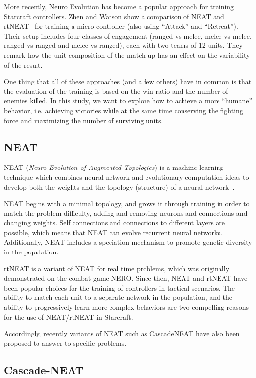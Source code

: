 More recently, Neuro Evolution has become a popular approach for
training Starcraft controllers. Zhen and Watson show a comparison of
NEAT and rtNEAT~\cite{ShWa13} for training a micro controller (also
using ``Attack'' and ``Retreat''). Their setup includes four classes
of engagement (ranged vs melee, melee vs melee, ranged vs ranged and
melee vs ranged), each with two teams of 12 units. They remark how the
unit composition of the match up has an effect on the variability of
the result.

One thing that all of these approaches (and a few others) have in
common is that the evaluation of the training is based on the win
ratio and the number of enemies killed. In this study, we want to
explore how to achieve a more ``humane'' behavior, i.e. achieving
victories while at the same time conserving the fighting force and
maximizing the number of surviving units.

\subsection{NEAT}\label{subsec:neat}

NEAT (\emph{Neuro Evolution of Augmented Topologies}) is a machine
learning technique which combines neural network and evolutionary
computation ideas to develop both the weights and the topology
(structure) of a neural network~\cite{StMi02}.

NEAT begins with a minimal topology, and grows it through training in
order to match the problem difficulty, adding and removing neurons and
connections and changing weights. Self connections and connections to
different layers are possible, which means that NEAT can evolve
recurrent neural networks. Additionally, NEAT includes a speciation
mechanism to promote genetic diversity in the population.

rtNEAT is a variant of NEAT for real time problems, which was
originally demonstrated on the combat game NERO. Since then, NEAT and
rtNEAT have been popular choices for the training of controllers in
tactical scenarios. The ability to match each unit to a separate
network in the population, and the ability to progressively learn more
complex behaviors are two compelling reasons for the use of
NEAT/rtNEAT in Starcraft.

Accordingly, recently variants of NEAT such as CascadeNEAT have also
been proposed to answer to specific problems.

\subsection{Cascade-NEAT}\label{subsec:cascade-neat}

